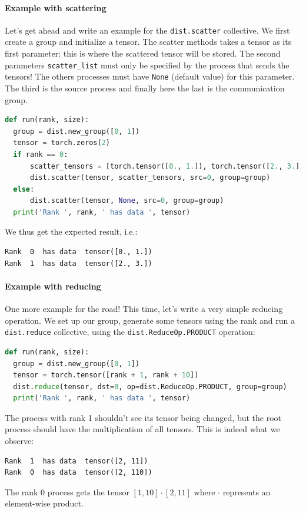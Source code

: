 \documentclass{article}
\begin{document}
\paragraph{Example with scattering}
Let's get ahead and write an example for the \lstinline{dist.scatter} collective. We first create a group and initialize a tensor. The scatter methods takes a tensor as its first parameter: this is where the scattered tensor will be stored. The second parameters \lstinline{scatter_list} must only be specified by the process that sends the tensors! The others processes must have \lstinline{None} (default value) for this parameter. The third is the source process and finally here the last is the communication group.

\begin{lstlisting}[language=Python]
def run(rank, size):
  group = dist.new_group([0, 1])
  tensor = torch.zeros(2)
  if rank == 0:
      scatter_tensors = [torch.tensor([0., 1.]), torch.tensor([2., 3.])]
      dist.scatter(tensor, scatter_tensors, src=0, group=group)
  else:
      dist.scatter(tensor, None, src=0, group=group)
  print('Rank ', rank, ' has data ', tensor)
\end{lstlisting}
We thus get the expected result, i.e.:
\begin{lstlisting}
Rank  0  has data  tensor([0., 1.])
Rank  1  has data  tensor([2., 3.])
\end{lstlisting}

\paragraph{Example with reducing}
One more example for the road! This time, let's write a very simple reducing operation. We set up our group, generate some tensors using the rank and run a \lstinline{dist.reduce} collective, using the \lstinline{dist.ReduceOp.PRODUCT} operation:
\begin{lstlisting}[language=Python]
def run(rank, size):
  group = dist.new_group([0, 1])
  tensor = torch.tensor([rank + 1, rank + 10])
  dist.reduce(tensor, dst=0, op=dist.ReduceOp.PRODUCT, group=group)
  print('Rank ', rank, ' has data ', tensor)
\end{lstlisting}
The process with rank 1 shouldn't see its tensor being changed, but the root process should have the multiplication of all tensors. This is indeed what we observe:
\begin{lstlisting}
Rank  1  has data  tensor([2, 11])
Rank  0  has data  tensor([2, 110])
\end{lstlisting}
The rank 0 process gets the tensor \([1, 10]\cdot [2, 11]\) where \(\cdot \) represents an element-wise product.
\end{document}
